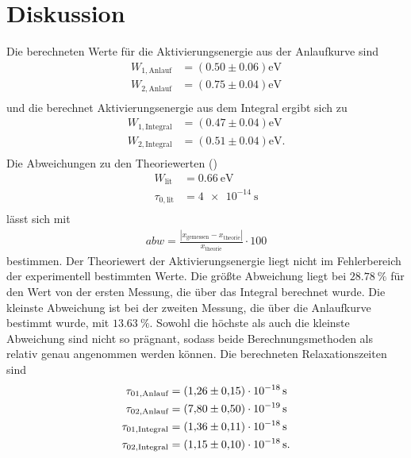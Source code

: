 \section{Diskussion}
\label{sec:Diskussion}
Die berechneten Werte für die Aktivierungsenergie aus der Anlaufkurve sind
\begin{align*}
    W_{1,\text{Anlauf}} &= (0.50 \pm 0.06) \unit{\electronvolt}\\
    W_{2,\text{Anlauf}} &= (0.75 \pm 0.04) \unit{\electronvolt}\\
\end{align*}
und die berechnet Aktivierungsenergie aus dem Integral ergibt sich zu
\begin{align*}
    W_{1,\text{Integral}} &= (0.47 \pm 0.04) \unit{\electronvolt}\\
    W_{2,\text{Integral}} &= (0.51 \pm 0.04)\unit{\electronvolt}.\\
\end{align*} 
Die Abweichungen zu den Theoriewerten (\cite{RMucillo}) 
\begin{align*}
    W_\text{lit}&= \qty{0.66}{\electronvolt}\\
    \tau_{0,\text{lit}}&= \qty{4e-14}{\second}\\ 
\end{align*}
lässt sich mit 
\begin{align*}
    abw=\frac{|x_\mathrm{gemessen}-x_\mathrm{theorie}|}{x_\mathrm{theorie}}\cdot 100 \label{eqn:abweich}
\end{align*}
bestimmen.
Der Theoriewert der Aktivierungsenergie liegt nicht im Fehlerbereich der experimentell
bestimmten Werte. Die größte Abweichung liegt bei $\qty{28.78}{\percent}$ für den Wert
von der ersten Messung, die über das Integral berechnet wurde. Die kleinste Abweichung
ist bei der zweiten Messung, die über die Anlaufkurve bestimmt wurde, mit $\qty{13.63}{\percent}$.
Sowohl die höchste als auch die kleinste Abweichung sind nicht so prägnant, sodass beide
Berechnungsmethoden als relativ genau angenommen werden können. 
Die berechneten Relaxationszeiten sind
\begin{align*}
    \tau_{01,\text{Anlauf}} &= \qty{1.26 (15)e-18}{\second}\\ 
    \tau_{02,\text{Anlauf}} &= \qty{7.80 (50)e-19}{\second}\\
    \tau_{01,\text{Integral}} &=\qty{1.36 (11)e-18}{\second}\\
    \tau_{02,\text{Integral}} &=\qty{1.15 (0.10)e-18}{\second}.\\
\end{align*}
